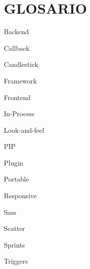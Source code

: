 \chapter*{GLOSARIO}

\begin{description}
    \item Backend
    \item Callback
    \item Candlestick
    \item Framework
    \item Frontend
    \item In-Process
    \item Look-and-feel
    \item PIP
    \item Plugin
    \item Portable
    \item Responsive
    \item Sass
    \item Scatter
    \item Sprints
    \item Triggers

\end{description}

\clearpage
